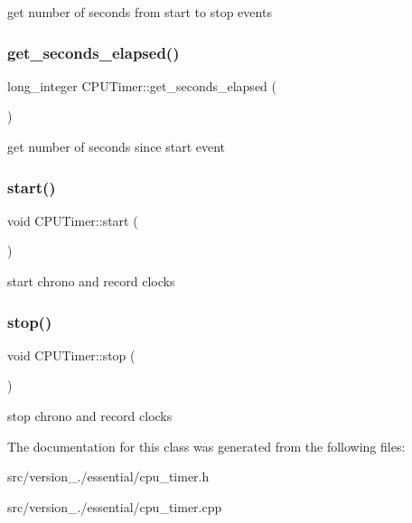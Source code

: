 get number of seconds from start to stop events \mbox{\label{classez_1_1essential_1_1CPUTimer_a867ed5183849fa164f01a035b04e0ad5}} 
\subsubsection{\texorpdfstring{get\+\_\+seconds\+\_\+elapsed()}{get\_seconds\_elapsed()}}
{\footnotesize\ttfamily long\+\_\+integer C\+P\+U\+Timer\+::get\+\_\+seconds\+\_\+elapsed (\begin{DoxyParamCaption}{ }\end{DoxyParamCaption})}

get number of seconds since start event \mbox{\label{classez_1_1essential_1_1CPUTimer_a2117cc7fd9f933bb0c6d28fdf9a9f74a}} 
\subsubsection{\texorpdfstring{start()}{start()}}
{\footnotesize\ttfamily void C\+P\+U\+Timer\+::start (\begin{DoxyParamCaption}{ }\end{DoxyParamCaption})}

start chrono and record clocks \mbox{\label{classez_1_1essential_1_1CPUTimer_a318dfb72b3b7e61ab90ea3699e7d66a6}} 
\subsubsection{\texorpdfstring{stop()}{stop()}}
{\footnotesize\ttfamily void C\+P\+U\+Timer\+::stop (\begin{DoxyParamCaption}{ }\end{DoxyParamCaption})}

stop chrono and record clocks 

The documentation for this class was generated from the following files\+:\begin{DoxyCompactItemize}
\item 
src/version\+\_./essential/cpu\+\_\+timer.\+h\item 
src/version\+\_./essential/cpu\+\_\+timer.\+cpp\end{DoxyCompactItemize}
